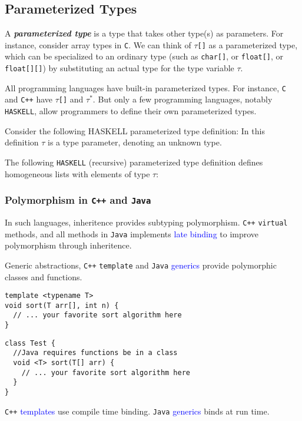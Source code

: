 \subsection{Parameterized Types}
\label{subsec:param-types}

A \textit{\textbf{parameterized type}} is a type that takes other type(s) as parameters. For instance, consider array types in \texttt{C}. We can think of \texttt{$\tau$[]} as a parameterized type, which can be specialized to an ordinary type (such as \texttt{char[]}, or \texttt{float[]}, or \texttt{float[][]}) by substituting an actual type for the type variable $\tau$.

All programming languages have built-in parameterized types. For instance, \texttt{C} and \texttt{C++} have \texttt{$\tau$[]} and $\tau^*$. But only a few programming languages, notably \texttt{HASKELL}, allow programmers to define their own parameterized types.

\begin{example}{}
Consider the following HASKELL parameterized type definition:
In this definition $\tau$ is a type parameter, denoting an unknown type.
\end{example}

\begin{example}{}
The following \texttt{HASKELL} (recursive) parameterized type definition defines homogeneous lists with elements of type $\tau$:
\end{example}

\subsubsection{Polymorphism in \texttt{C++} and \texttt{Java}}
\label{subsubsec:poly-in-cpp-java}

In such languages, inheritence provides subtyping polymorphism. \texttt{C++} \texttt{virtual} methods, and all methods in \texttt{Java} implements \textcolor{blue}{late binding} to improve polymorphism  through inheritence.

Generic abstractions, \texttt{C++} \texttt{template} and \texttt{Java} \textcolor{blue}{generics} provide polymorphic classes and functions.
\begin{listing}[H]

\begin{verbatim}
template <typename T>
void sort(T arr[], int n) {
  // ... your favorite sort algorithm here
}
\end{verbatim}

\begin{verbatim}
class Test { 
  //Java requires functions be in a class
  void <T> sort(T[] arr) {
    // ... your favorite sort algorithm here
  }
}
\end{verbatim}

\caption{}
\label{code:code1}
\end{listing}
\texttt{C++} \textcolor{blue}{templates} use compile time binding. \texttt{Java} \textcolor{blue}{generics} binds at run time.

\vspace*{\fill}
\columnbreak
